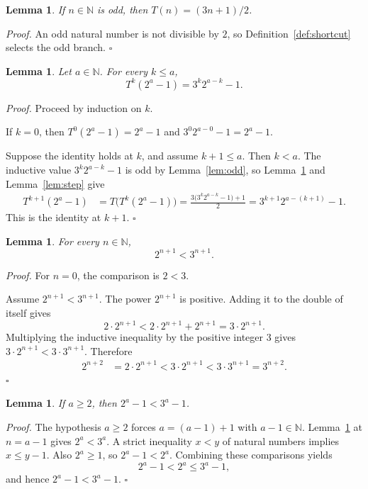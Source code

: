 \documentclass[11pt,letterpaper]{article}
\newcommand{\N}{\mathbb{N}}
\newtheorem{lemma}[theorem]{Lemma}
\newenvironment{proof}{\noindent\textit{Proof.}}{\hfill\(\square\)}
\begin{document}
\begin{lemma}
\label{lem:branch}
If \(n\in\N\) is odd, then \(T(n)=(3n+1)/2\).
\end{lemma}

\begin{proof}
An odd natural number is not divisible by \(2\), so Definition~\ref{def:shortcut} selects the odd branch.
\end{proof}

\begin{lemma}
\label{lem:closed}
Let \(a\in\N\). For every \(k\le a\),
\[
T^{k}(2^{a}-1)=3^{k}2^{a-k}-1.
\]
\end{lemma}

\begin{proof}
Proceed by induction on \(k\).

If \(k=0\), then \(T^{0}(2^{a}-1)=2^{a}-1\) and \(3^{0}2^{a-0}-1=2^{a}-1\).

Suppose the identity holds at \(k\), and assume \(k+1\le a\). Then \(k<a\). The inductive value \(3^{k}2^{a-k}-1\) is odd by Lemma~\ref{lem:odd}, so Lemma~\ref{lem:branch} and Lemma~\ref{lem:step} give
\begin{align*}
T^{k+1}(2^{a}-1)
&=T\bigl(T^{k}(2^{a}-1)\bigr)
=\frac{3\bigl(3^{k}2^{a-k}-1\bigr)+1}{2}
=3^{k+1}2^{a-(k+1)}-1.
\end{align*}
This is the identity at \(k+1\).
\end{proof}

\begin{lemma}
\label{lem:powers}
For every \(n\in\N\),
\[
2^{n+1}<3^{n+1}.
\]
\end{lemma}

\begin{proof}
For \(n=0\), the comparison is \(2<3\).

Assume \(2^{n+1}<3^{n+1}\). The power \(2^{n+1}\) is positive. Adding it to the double of itself gives
\[
2\cdot 2^{n+1}<2\cdot 2^{n+1}+2^{n+1}=3\cdot 2^{n+1}.
\]
Multiplying the inductive inequality by the positive integer \(3\) gives \(3\cdot 2^{n+1}<3\cdot 3^{n+1}\). Therefore
\begin{align*}
2^{n+2}
&=2\cdot 2^{n+1}
<3\cdot 2^{n+1}
<3\cdot 3^{n+1}
=3^{n+2}.
\end{align*}
\end{proof}

\begin{lemma}
\label{lem:strict}
If \(a\ge 2\), then \(2^{a}-1<3^{a}-1\).
\end{lemma}

\begin{proof}
The hypothesis \(a\ge 2\) forces \(a=(a-1)+1\) with \(a-1\in\N\). Lemma~\ref{lem:powers} at \(n=a-1\) gives \(2^{a}<3^{a}\). A strict inequality \(x<y\) of natural numbers implies \(x\le y-1\). Also \(2^{a}\ge 1\), so \(2^{a}-1<2^{a}\). Combining these comparisons yields
\[
2^{a}-1<2^{a}\le 3^{a}-1,
\]
and hence \(2^{a}-1<3^{a}-1\).
\end{proof}
\end{document}
